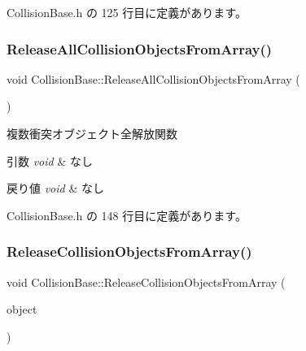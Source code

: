  Collision\+Base.\+h の 125 行目に定義があります。

\mbox{\label{class_collision_base_a54d52219e2bf43ed2a9b2a11813934ea}} 
\subsubsection{\texorpdfstring{Release\+All\+Collision\+Objects\+From\+Array()}{ReleaseAllCollisionObjectsFromArray()}}
{\footnotesize\ttfamily void Collision\+Base\+::\+Release\+All\+Collision\+Objects\+From\+Array (\begin{DoxyParamCaption}{ }\end{DoxyParamCaption})\hspace{0.3cm}{\ttfamily [inline]}}



複数衝突オブジェクト全解放関数 


\begin{DoxyParams}{引数}
{\em void} & なし \\
\hline
\end{DoxyParams}

\begin{DoxyRetVals}{戻り値}
{\em void} & なし \\
\hline
\end{DoxyRetVals}


 Collision\+Base.\+h の 148 行目に定義があります。

\mbox{\label{class_collision_base_a46bbb58a0dd818fc172f34462b1d5b08}} 
\subsubsection{\texorpdfstring{Release\+Collision\+Objects\+From\+Array()}{ReleaseCollisionObjectsFromArray()}}
{\footnotesize\ttfamily void Collision\+Base\+::\+Release\+Collision\+Objects\+From\+Array (\begin{DoxyParamCaption}\item[{\mbox{\hyperlink{class_collision_objects}{Collision\+Objects}} $\ast$}]{object }\end{DoxyParamCaption})\hspace{0.3cm}{\ttfamily [inline]}}



